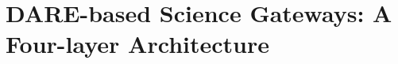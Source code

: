 \documentclass[]{svjour3}
\begin{document}






\section{DARE-based Science Gateways: A Four-layer Architecture}

\end{document}
